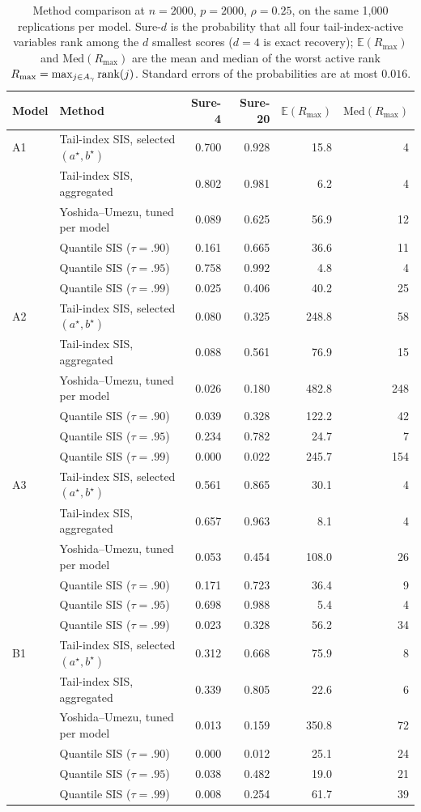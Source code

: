 \begin{table}[t]
\centering
\caption{Method comparison at $n=2000$, $p=2000$, $\rho=0.25$, on the same 1{,}000 replications per model. Sure-$d$ is the probability that all four tail-index-active variables rank among the $d$ smallest scores ($d=4$ is exact recovery); $\mathbb{E}(R_{\max})$ and $\mathrm{Med}(R_{\max})$ are the mean and median of the worst active rank $R_{\max}=\max_{j\in A_\gamma}\mathrm{rank}(j)$. Standard errors of the probabilities are at most $0.016$.}
\label{tab:cmp2000}
\begin{tabular}{llrrrr}
\toprule
Model & Method & Sure-4 & Sure-20 & $\mathbb{E}(R_{\max})$ & $\mathrm{Med}(R_{\max})$\\
\midrule
A1 & Tail-index SIS, selected $(a^\star,b^\star)$ & 0.700 & 0.928 & 15.8 & 4\\
 & Tail-index SIS, aggregated & 0.802 & 0.981 & 6.2 & 4\\
 & Yoshida--Umezu, tuned per model & 0.089 & 0.625 & 56.9 & 12\\
 & Quantile SIS ($\tau=.90$) & 0.161 & 0.665 & 36.6 & 11\\
 & Quantile SIS ($\tau=.95$) & 0.758 & 0.992 & 4.8 & 4\\
 & Quantile SIS ($\tau=.99$) & 0.025 & 0.406 & 40.2 & 25\\
\addlinespace
A2 & Tail-index SIS, selected $(a^\star,b^\star)$ & 0.080 & 0.325 & 248.8 & 58\\
 & Tail-index SIS, aggregated & 0.088 & 0.561 & 76.9 & 15\\
 & Yoshida--Umezu, tuned per model & 0.026 & 0.180 & 482.8 & 248\\
 & Quantile SIS ($\tau=.90$) & 0.039 & 0.328 & 122.2 & 42\\
 & Quantile SIS ($\tau=.95$) & 0.234 & 0.782 & 24.7 & 7\\
 & Quantile SIS ($\tau=.99$) & 0.000 & 0.022 & 245.7 & 154\\
\addlinespace
A3 & Tail-index SIS, selected $(a^\star,b^\star)$ & 0.561 & 0.865 & 30.1 & 4\\
 & Tail-index SIS, aggregated & 0.657 & 0.963 & 8.1 & 4\\
 & Yoshida--Umezu, tuned per model & 0.053 & 0.454 & 108.0 & 26\\
 & Quantile SIS ($\tau=.90$) & 0.171 & 0.723 & 36.4 & 9\\
 & Quantile SIS ($\tau=.95$) & 0.698 & 0.988 & 5.4 & 4\\
 & Quantile SIS ($\tau=.99$) & 0.023 & 0.328 & 56.2 & 34\\
\addlinespace
B1 & Tail-index SIS, selected $(a^\star,b^\star)$ & 0.312 & 0.668 & 75.9 & 8\\
 & Tail-index SIS, aggregated & 0.339 & 0.805 & 22.6 & 6\\
 & Yoshida--Umezu, tuned per model & 0.013 & 0.159 & 350.8 & 72\\
 & Quantile SIS ($\tau=.90$) & 0.000 & 0.012 & 25.1 & 24\\
 & Quantile SIS ($\tau=.95$) & 0.038 & 0.482 & 19.0 & 21\\
 & Quantile SIS ($\tau=.99$) & 0.008 & 0.254 & 61.7 & 39\\
\bottomrule
\end{tabular}
\end{table}
